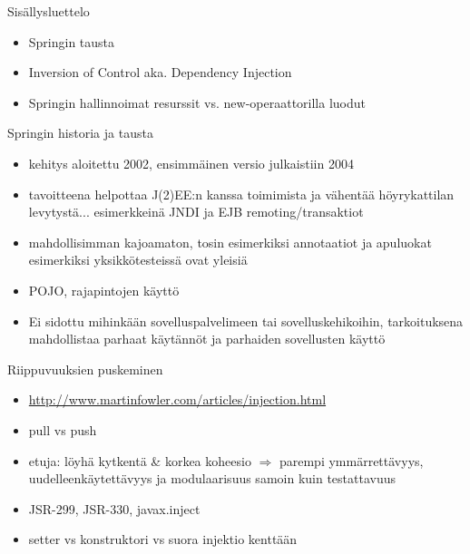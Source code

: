 \documentclass[hyperref={pdfauthor=\AUTHOR},14pt]{beamer}
\author{\AUTHOR}
\title[\TITLE]{\TITLE}
\date{\DATE}
\begin{document}
\begin{frame}[plain]
\titlepage
\end{frame}

\begin{frame}[t, fragile]{Sisällysluettelo}
\begin{itemize}
\item Springin tausta
\item Inversion of Control aka. Dependency Injection
\item Springin hallinnoimat resurssit vs. new-operaattorilla luodut
\end{itemize}
\end{frame}

\begin{frame}{Springin historia ja tausta}
\begin{itemize}
\item kehitys aloitettu 2002, ensimmäinen versio julkaistiin 2004
\item tavoitteena helpottaa J(2)EE:n kanssa toimimista ja vähentää
  höyrykattilan levytystä... esimerkkeinä JNDI ja EJB remoting/transaktiot
\item mahdollisimman kajoamaton, tosin esimerkiksi annotaatiot ja
  apuluokat esimerkiksi yksikkötesteissä ovat yleisiä
\item POJO, rajapintojen käyttö
\item Ei sidottu mihinkään sovelluspalvelimeen tai sovelluskehikoihin,
  tarkoituksena mahdollistaa parhaat käytännöt ja parhaiden
  sovellusten käyttö
\end{itemize}
\end{frame}

\begin{frame}{Riippuvuuksien puskeminen}
\begin{itemize}
\item \url{http://www.martinfowler.com/articles/injection.html}
\item pull vs push
%
\item etuja: löyhä kytkentä \& korkea koheesio $ \Rightarrow $ parempi
  ymmärrettävyys, uudelleenkäytettävyys ja modulaarisuus samoin kuin testattavuus
\item JSR-299, JSR-330, javax.inject
\item setter vs konstruktori vs suora injektio kenttään
\end{itemize}
\end{frame}
\end{document}
